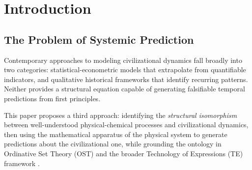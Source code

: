 \documentclass[12pt,a4paper]{article}
\begin{document}
\begin{abstract}
At every scale simultaneously, the intensifying attractor signal reveals incompatibilities: elements whose state is incoherent with the signal's direction are resolved at the time and in the form coherent with the attractor, regardless of their biological age, size, or position. The accelerating frequency of micro-junctions approaching a macro-junction is the direct manifestation of this process: the signal intensifies, incompatibilities are revealed and resolved at increasing rate.

\vspace{0.5em}
\noindent\textbf{Keywords:} ordinative acceleration constant, attractor signal, phase transitions, reaction-diffusion systems, civilizational dynamics, Ordinative Set Theory, structural \textit{Controfase}, causal inversion, harmonic multi-scale dynamics

\vspace{0.5em}
\noindent\textbf{Status:} v1.2 Beta --- three confirmed micro-junctions ($\mu_1$, $\mu_2$, $\mu_3$), under observation and continuous refinement. Updated versions will be released as subsequent micro-junctions are confirmed or falsified. Next checkpoint: $\mu_4$ ($\sim$31 May 2026).
\end{abstract}

\newpage
\tableofcontents
\newpage


\section{Introduction}

\subsection{The Problem of Systemic Prediction}

Contemporary approaches to modeling civilizational dynamics fall broadly into two categories: statistical-econometric models that extrapolate from quantifiable indicators, and qualitative historical frameworks that identify recurring patterns. Neither provides a structural equation capable of generating falsifiable temporal predictions from first principles.

This paper proposes a third approach: identifying the \emph{structural isomorphism} between well-understood physical-chemical processes and civilizational dynamics, then using the mathematical apparatus of the physical system to generate predictions about the civilizational one, while grounding the ontology in Ordinative Set Theory (OST) \cite{te_ordinative_sets,ost_v21} and the broader Technology of Expressions (TE) framework \cite{te_core}.
\end{document}
